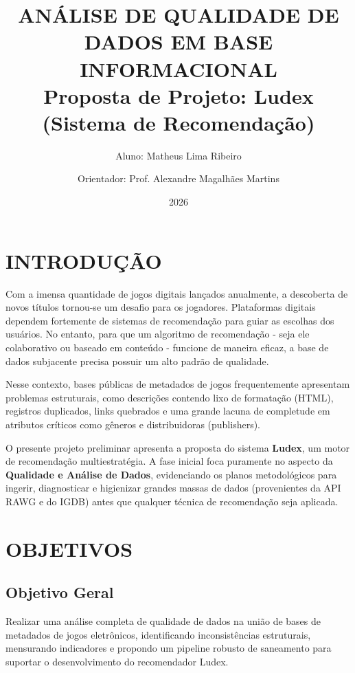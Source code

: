 \documentclass[12pt,a4paper]{article}
\title{ANÁLISE DE QUALIDADE DE DADOS EM BASE INFORMACIONAL\\ \large Proposta de Projeto: Ludex (Sistema de Recomendação)}
\author{Aluno: Matheus Lima Ribeiro \and Orientador: Prof. Alexandre Magalhães Martins}
\date{2026}
\begin{document}
\maketitle
\thispagestyle{empty}
\newpage

\tableofcontents
\newpage

\section{INTRODUÇÃO}
Com a imensa quantidade de jogos digitais lançados anualmente, a descoberta de novos títulos tornou-se um desafio para os jogadores. Plataformas digitais dependem fortemente de sistemas de recomendação para guiar as escolhas dos usuários. No entanto, para que um algoritmo de recomendação - seja ele colaborativo ou baseado em conteúdo - funcione de maneira eficaz, a base de dados subjacente precisa possuir um alto padrão de qualidade.

Nesse contexto, bases públicas de metadados de jogos frequentemente apresentam problemas estruturais, como descrições contendo lixo de formatação (HTML), registros duplicados, links quebrados e uma grande lacuna de completude em atributos críticos como gêneros e distribuidoras (publishers). 

O presente projeto preliminar apresenta a proposta do sistema \textbf{Ludex}, um motor de recomendação multiestratégia. A fase inicial foca puramente no aspecto da \textbf{Qualidade e Análise de Dados}, evidenciando os planos metodológicos para ingerir, diagnosticar e higienizar grandes massas de dados (provenientes da API RAWG e do IGDB) antes que qualquer técnica de recomendação seja aplicada.

\section{OBJETIVOS}
\subsection{Objetivo Geral}
Realizar uma análise completa de qualidade de dados na união de bases de metadados de jogos eletrônicos, identificando inconsistências estruturais, mensurando indicadores e propondo um pipeline robusto de saneamento para suportar o desenvolvimento do recomendador Ludex.
\end{document}
